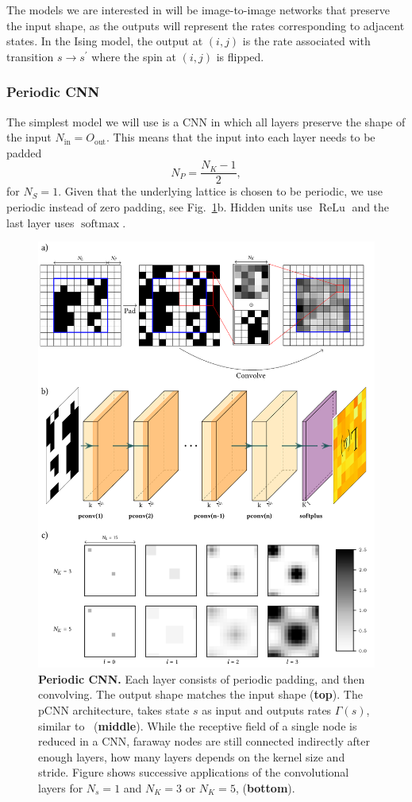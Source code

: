 The models we are interested in will be image-to-image networks that preserve the input shape, as the outputs will represent the rates corresponding to adjacent states. In the Ising model, the output at $(i, j)$ is the rate associated with transition $s \rightarrow s^\prime$ where the spin at $(i, j)$ is flipped.
\subsubsection{Periodic CNN}
The simplest model we will use is a CNN in which all layers preserve the shape of the input $N_\text{in} = O_\text{out}$. This means that the input into each layer needs to be padded
\begin{equation}
		N_{P} = \frac{N_{K}-1}{2},
\end{equation}
for $N_S = 1$. Given that the underlying lattice is chosen to be periodic, we use periodic instead of zero padding, see Fig.~\ref{fig:pcnn}b. Hidden units use $\operatorname{ReLu}$ and the last layer uses $\operatorname{softmax}$. 
\begin{figure}[H]
	\centering
	\includegraphics[width=\linewidth]{Chapter4/Figs/Vector/pcnn.pdf}
	\caption[Periodic CNN]{\textbf{Periodic CNN.} Each layer consists of periodic padding, and then convolving. The output shape matches the input shape (\textbf{top}). The pCNN architecture, takes state $s$ as input and outputs rates $\Gamma(s)$, similar to~\cite{gispen2020ground} (\textbf{middle}). While the receptive field of a single node is reduced in a CNN, faraway nodes are still connected indirectly after enough layers, how many layers depends on the kernel size and stride. Figure shows successive applications of the convolutional layers for $N_s=1$ and $N_K = 3$ or $N_K=5$, (\textbf{bottom}).}
	\label{fig:pcnn}
\end{figure}
